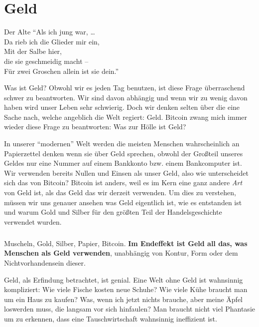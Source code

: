 \chapter{Geld}
\label{les:11}

\begin{chapquote}{Der Alte}
\enquote{Als ich jung war, \ldots \\
Da rieb ich die Glieder mir ein, \\
Mit der Salbe hier, \\
die sie geschmeidig macht -- \\
Für zwei Groschen allein ist sie dein.}
\end{chapquote}

Was ist Geld? Obwohl wir es jeden Tag benutzen, ist diese Frage überraschend
schwer zu beantworten. Wir sind davon abhängig und wenn wir zu wenig davon haben
wird unser Leben sehr schwierig. Doch wir denken selten über die eine Sache
nach, welche angeblich die Welt regiert: Geld. Bitcoin zwang mich immer wieder
diese Frage zu beantworten: Was zur Hölle ist Geld?

In unserer \enquote{modernen} Welt werden die meisten Menschen wahrscheinlich an
Papierzettel denken wenn sie über Geld sprechen, obwohl der Großteil unseres
Geldes nur eine Nummer auf einem Bankkonto bzw. einem Bankcomputer ist. Wir
verwenden bereits Nullen und Einsen als unser Geld, also wie unterscheidet sich
das von Bitcoin? Bitcoin ist anders, weil es im Kern eine ganz andere
\textit{Art} von Geld ist, als das Geld das wir derzeit verwenden. Um dies zu
verstehen, müssen wir uns genauer ansehen was Geld eigentlich ist, wie es
entstanden ist und warum Gold und Silber für den größten Teil der
Handelsgeschichte verwendet wurden.

\paragraph{}
Muscheln, Gold, Silber, Papier, Bitcoin. \textbf{Im Endeffekt ist Geld all das,
was Menschen als Geld verwenden}, unabhängig von Kontur, Form
oder dem Nichtvorhandensein dieser.

Geld, als Erfindung betrachtet, ist genial. Eine Welt ohne Geld ist wahnsinnig
kompliziert: Wie viele Fische kosten neue Schuhe? Wie viele Kühe braucht man um
ein Haus zu kaufen? Was, wenn ich jetzt nichts brauche, aber meine Äpfel
loswerden muss, die langsam vor sich hinfaulen? Man braucht nicht viel Phantasie
um zu erkennen, dass eine Tauschwirtschaft wahnsinnig ineffizient ist.

